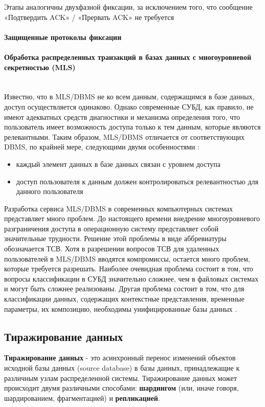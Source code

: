 Этапы аналогичны двухфазной фиксации, за исключением того, что сообщение «Подтвердить ACK» / «Прервать ACK» не требуется

\paragraph{Защищенные протоколы фиксации}
\paragraph{Обработка распределенных транзакций в базах данных с многоуровневой секретностью (MLS)}~\\
Известно, что в MLS/DBMS не ко всем данным, содержащимся в  базе
данных, доступ осуществляется одинаково. Однако современные СУБД, как
правило,  не имеют адекватных средств диагностики и механизма определения
того, что пользователь имеет возможность доступа только  к  тем
данным,  которые являются релевантными. Таким образом, MLS/DBMS отличается
от соответствующих DBMS,  по крайней  мере,  следующими  двумя
особенностями \autocite{SecureFix}:
\begin{itemize}
    \item каждый элемент данных в базе данных связан с уровнем доступа
    \item доступ пользователя к данным должен контролироваться релевантностью для данного пользователя
\end{itemize}
Разработка сервиса MLS/DBMS в современных компьютерных  системах
представляет  много  проблем. До настоящего времени внедрение многоуровневого
разграничения доступа в операционную  систему  представляет
собой  значительные трудности. Решение этой проблемы в виде аббревиатуры
обозначается ТСВ. Хотя в разрешении вопросов ТСВ  для  удаленных
пользователей  в  MLS/DBMS вводятся компромиссы, остается много проблем,
которые требуется разрешать. Наиболее очевидная проблема состоит
в том, что вопросы классификации в СУБД значительно  сложнее,  чем  в
файловых  системах  и могут быть сложнее реализованы. Другая проблема
состоит в том, что для классификации данных,  содержащих  контекстные
представления,  временные параметры, их композицию, необходимы унифицированные базы данных \autocite{SecureFix}.

\subsection{Тиражирование данных}
\textbf{Тиражирование данных} - это асинхронный перенос изменений объектов исходной базы данных (source database)
в базы данных, принадлежащие к различным узлам распределенной системы. Тиражирование данных может происходит
двумя различными способами: \textbf{шардингом} (или, иначе говоря, шардированием, фрагментацией) и \textbf{репликацией}.

